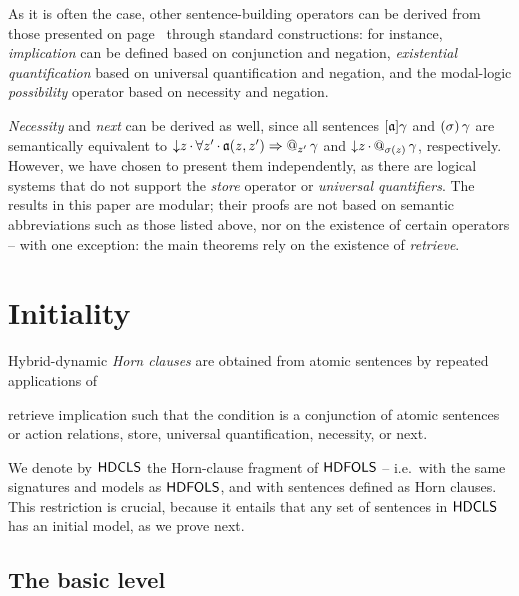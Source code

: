 \documentclass[a4paper,UKenglish,cleveref,autoref]{lipics-v2019}
\begin{document}
As it is often the case, other sentence-building operators can be derived from those presented on page~\pageref{sentence-building-operators} through standard constructions: for instance, \emph{implication} can be defined based on conjunction and negation, \emph{existential quantification} based on universal quantification and negation, and the modal-logic \emph{possibility} operator based on necessity and negation.

\emph{Necessity} and \emph{next} can be derived as well, since all sentences \([\mathfrak{a}] \gamma\) and \((\sigma)\, \gamma\) are semantically equivalent to \({\downarrow}z\,{\cdot}\, \forall z'\,{\cdot}\, \mathfrak{a}(z, z') \Rightarrow @_{z'}\, \gamma\) and \({\downarrow}z\,{\cdot}\, @_{\sigma(z)}\, \gamma\), respectively.
However, we have chosen to present them independently, as there are logical systems that do not support the \emph{store} operator or \emph{universal quantifiers}.
The results in this paper are modular; their proofs are not based on semantic abbreviations such as those listed above, nor on the existence of certain operators -- with one exception: the main theorems rely on the existence of \emph{retrieve}.


\section{Initiality}
\label{section:initiality}

Hybrid-dynamic \emph{Horn clauses} are obtained from atomic sentences by repeated applications of%
\begin{inparenum}
  \inparitem retrieve
  \inparitem implication such that the condition is a conjunction of atomic sentences or action relations, 
  \inparitem store,
  \inparitem universal quantification,
  \inparitem necessity, or
  \inparitem next.
\end{inparenum}
We denote by \({\mathsf{HDCLS}}\) the Horn-clause fragment of \({\mathsf{HDFOLS}}\) -- i.e.\ with the same signatures and models as \({\mathsf{HDFOLS}}\), and with sentences defined as Horn clauses.
This restriction is crucial, because it entails that any set of sentences in \({\mathsf{HDCLS}}\) has an initial model, as we prove next.


\subsection{The basic level}
\label{subsection:basic-level}
\end{document}
